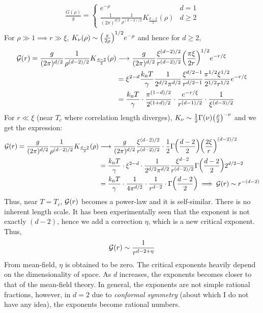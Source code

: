 \begin{align}
    \begin{split}
        \frac{G(\rho)}{g} = \begin{cases}
            e^{-\rho} & d=1 \\
            \frac{1}{(2\pi)^{d/2}} \frac{1}{\rho^{(d-2)/2}} K_{\frac{d-2}{2}}(\rho) & d \geq 2
        \end{cases}
    \end{split}
\end{align}
For $\rho\gg 1 \implies r \gg \xi$, $K_\nu(\rho) \sim \qty(\frac{\pi}{2\rho})^{1/2}e^{-\rho}$ and hence for $d\geq 2$, 
\begin{align}
   \begin{split}
     \mathcal G(r) =\frac{g}{(2\pi)^{d/2}} \frac{1}{\rho^{(d-2)/2}} K_{\frac{d-2}{2}}(\rho)&\longrightarrow
    \frac{g}{(2\pi)^{d/2}} \frac{\xi^{(d-2)/2}}{r^{(d-2)/2}}\qty(\frac{\pi \xi}{2r})^{1/2}e^{-r/\xi}\\
    &= \xi^{2-d}\frac{k_{\text{\tiny B}} T}{\gamma}\frac{1}{2^{d/2}\pi^{d/2}} \frac{\xi^{d/2-1}}{r^{d/2-1}} \frac{\pi^{1/2}\xi^{1/2}}{2^{1/2}r^{1/2}}e^{-r/\xi} \\
    &=\frac{k_{\text{\tiny B}} T}{\gamma}\cdot  \frac{\pi^{(1-d)/2}}{2^{(1+d)/2}}\cdot \frac{e^{-r/\xi}}{r^{(d-1)/2}}\cdot \frac{1}{\xi^{(d-3)/2}}
   \end{split}
\end{align}
For $r\ll \xi$ (near $T_c$ where correlation length diverges), $K_\nu \sim \frac{1}{2}\Gamma(\nu) \qty(\frac{\rho}{2})^{-\nu}$ and we get the expression: 
\begin{align}
    \begin{split}
        \mathcal G(r) = \frac{g}{(2\pi)^{d/2}} \frac{1}{\rho^{(d-2)/2}} K_{\frac{d-2}{2}}(\rho)&\longrightarrow 
        \frac{g}{(2\pi)^{d/2}} \frac{\xi^{(d-2)/2}}{r^{(d-2)/2}}\cdot \frac{1}{2}\Gamma\qty(\frac{d-2}{2}) \qty(\frac{2\xi}{r})^{(d-2)/2}\\
        &= \frac{k_{\text{\tiny B}} T}{\gamma}\cdot \xi^{2-d}\cdot \frac{1}{2^{d/2}\pi^{d/2}}\frac{\xi^{d-2}}{r^{(d-2)/2}}\Gamma\qty(\frac{d-2}{2})2^{d/2 -2}\\
        &= \frac{k_{\text{\tiny B}} T}{\gamma} \cdot \frac{1}{4\pi^{d/2}}\cdot \frac{1}{r^{d-2}}\cdot \Gamma\qty(\frac{d-2}{2}) \implies \mathcal G(r) \sim r^{-(d-2)}
    \end{split}
\end{align}
Thus, near $T=T_c$, $\mathcal G(r)$ becomes a power-law and it is self-similar. There is no inherent length scale. It has been experimentally seen that the exponent is not exactly $(d-2)$, hence we add a correction $\eta$, which is a new critical exponent. Thus, 
\begin{equation}
    \mathcal G(r) \sim \frac{1}{r^{d-2+\eta}}
\end{equation}
From mean-field, $\eta$ is obtained to be zero. The critical exponents heavily depend on the dimensionality of space. As $d$ increases, the exponents becomes closer to that of the mean-field theory. In general, the exponents are not simple rational fractions, however, in $d=2$ due to \textit{conformal symmetry} (about which I do not have any idea), the exponents become rational numbers. 